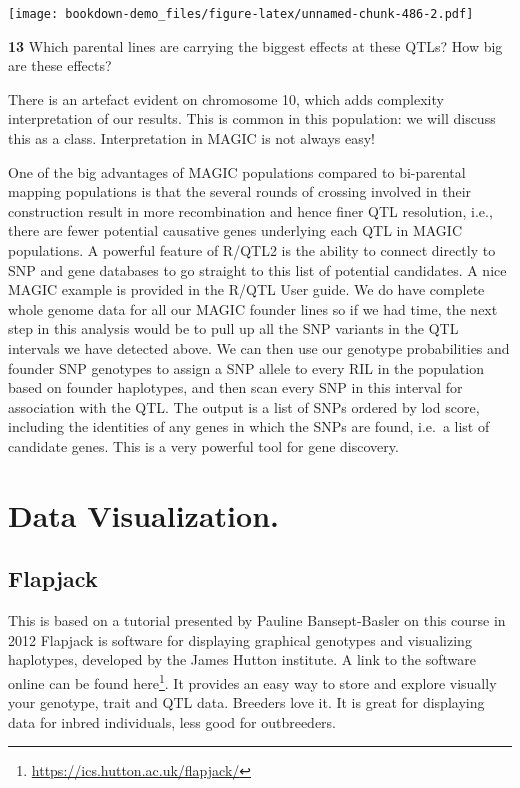 \documentclass[
]{book}
\makeatletter
\renewcommand{\href}[2]{#2\footnote{\url{#1}}}
\newenvironment{kframe}{%
\medskip{}
\setlength{\fboxsep}{.8em}
 \def\at@end@of@kframe{}%
 \ifinner\ifhmode%
  \def\at@end@of@kframe{\end{minipage}}%
  \begin{minipage}{\columnwidth}%
 \fi\fi%
 \def\FrameCommand##1{\hskip\@totalleftmargin \hskip-\fboxsep
 \colorbox{shadecolor}{##1}\hskip-\fboxsep
     \hskip-\linewidth \hskip-\@totalleftmargin \hskip\columnwidth}%
 \MakeFramed {\advance\hsize-\width
   \@totalleftmargin\z@ \linewidth\hsize
   \@setminipage}}%
 {\par\unskip\endMakeFramed%
 \at@end@of@kframe}
\newenvironment{rmdblock}[1]
  {
  \begin{itemize}
  \renewcommand{\labelitemi}{
    \raisebox{-.7\height}[0pt][0pt]{
      {\setkeys{Gin}{width=3em,keepaspectratio}\texttt{[image: images/\#1]}}
    }
  }
  \setlength{\fboxsep}{1em}
  \begin{kframe}
  \item
  }
  {
  \end{kframe}
  \end{itemize}
  }
\newenvironment{rmdquiz}
  {\begin{rmdblock}{quiz}}
  {\end{rmdblock}}
\makeatother
\begin{document}
\texttt{[image: bookdown-demo\_files/figure-latex/unnamed-chunk-486-2.pdf]}

\begin{rmdquiz}
\textbf{13}
Which parental lines are carrying the biggest effects at these QTLs? How big are these effects?
\end{rmdquiz}

There is an artefact evident on chromosome 10, which adds complexity interpretation of our results. This is common in this population: we will discuss this as a class. Interpretation in MAGIC is not always easy!

One of the big advantages of MAGIC populations compared to bi-parental mapping populations is that the several rounds of crossing involved in their construction result in more recombination and hence finer QTL resolution, i.e., there are fewer potential causative genes underlying each QTL in MAGIC populations. A powerful feature of R/QTL2 is the ability to connect directly to SNP and gene databases to go straight to this list of potential candidates. A nice MAGIC example is provided in the R/QTL User guide. We do have complete whole genome data for all our MAGIC founder lines so if we had time, the next step in this analysis would be to pull up all the SNP variants in the QTL intervals we have detected above. We can then use our genotype probabilities and founder SNP genotypes to assign a SNP allele to every RIL in the population based on founder haplotypes, and then scan every SNP in this interval for association with the QTL. The output is a list of SNPs ordered by lod score, including the identities of any genes in which the SNPs are found, i.e.~a list of candidate genes. This is a very powerful tool for gene discovery.

\hypertarget{Data-Visualization}{%
\chapter{Data Visualization.}\label{Data-Visualization}}

\hypertarget{flapjack}{%
\section{Flapjack}\label{flapjack}}

This is based on a tutorial presented by Pauline Bansept-Basler on this course in 2012
Flapjack is software for displaying graphical genotypes and visualizing haplotypes, developed
by the James Hutton institute. A link to the software online can be found \href{https://ics.hutton.ac.uk/flapjack/}{here}. It provides an easy way to store and explore visually your genotype, trait and QTL data. Breeders love it. It is great for displaying data for inbred individuals, less good for outbreeders.
\end{document}
